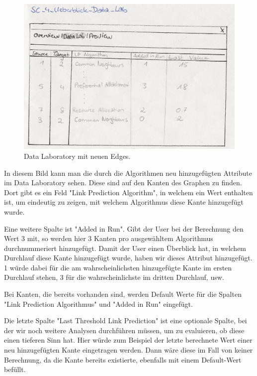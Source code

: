 \begin{figure}[htbp]
    \includegraphics[width=\linewidth]{resources/SC-4.png}
    \caption{Data Laboratory mit neuen Edges.}
    \label{fig:screen4}
\end{figure}

In diesem Bild kann man die durch die Algorithmen neu hinzugefügten Attribute im Data Laboratory sehen. Diese sind auf
den Kanten des Graphen zu finden. Dort gibt es ein Feld "Link Prediction Algorithm", in welchem ein Wert enthalten ist,
um eindeutig zu zeigen, mit welchem Algorithmus diese Kante hinzugefügt wurde.

Eine weitere Spalte ist "Added in Run". Gibt der User bei der Berechnung den Wert 3 mit, so werden hier 3 Kanten pro
ausgewähltem Algorithmus durchnummeriert hinzugefügt. Damit der User einen Überblick hat, in welchem Durchlauf diese
Kante hinzugefügt wurde, haben wir dieses Attribut hinzugefügt. 1 würde dabei für die am wahrscheinlichsten hinzugefügte
Kante im ersten Durchlauf stehen, 3 für die wahrscheinlichste im dritten Durchlauf, usw.

Bei Kanten, die bereits vorhanden sind, werden Default Werte für die Spalten "Link Prediction Algorithmus" und "Added
in Run" eingefügt.

Die letzte Spalte "Last Threshold Link Prediction" ist eine optionale Spalte, bei der wir noch weitere Analysen
durchführen müssen, um zu evaluieren, ob diese einen tieferen Sinn hat. Hier würde zum Beispiel der letzte berechnete
Wert einer neu hinzugefügten Kante eingetragen werden. Dann wäre diese im Fall von keiner Berechnung, da die Kante
bereits existierte, ebenfalls mit einem Default-Wert befüllt.

